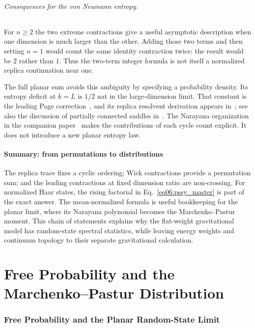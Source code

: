 \documentclass[11pt,letterpaper]{article}
\theoremstyle{plain}
\theoremstyle{definition}
\theoremstyle{remark}
\begin{document}
\paragraph{Consequences for the von Neumann entropy.}
For $n\geq2$ the two extreme contractions give a useful asymptotic description
when one dimension is much larger than the other.  Adding those two terms and
then setting $n=1$ would count the same identity contraction twice: the result
would be $2$ rather than $1$.  Thus the two-term integer formula is not itself
a normalized replica continuation near one.

The full planar sum avoids this ambiguity by specifying a probability density.
Its entropy deficit at $k=L$ is $1/2$ nat in the large-dimension limit.  That
constant is the leading Page correction~\citep{page1993}, and its replica
resolvent derivation appears in~\citet{pssyetal2022}; see also the discussion of
partially connected saddles in~\citet{marolfmaxfield2020}.  The Narayana
organization in the companion paper~\citep{wuebben2026paper1} makes the
contributions of each cycle count explicit.  It does not introduce a new
planar entropy law.

\subsection{Summary: from permutations to distributions}
\label{subsec06:summary}

The replica trace fixes a cyclic ordering; Wick contractions provide a
permutation sum; and the leading contractions at fixed dimension ratio are
non-crossing.  For normalized Haar states, the rising factorial in
Eq.~\eqref{eq06:pssy_master} is part of the exact answer.  The mean-normalized
formula is useful bookkeeping for the planar limit, where its Narayana
polynomial becomes the Marchenko--Pastur moment.  This chain of statements
explains why the flat-weight gravitational model has random-state spectral
statistics, while leaving energy weights and continuum topology to their
separate gravitational calculation.


\part{Free Probability and the Marchenko--Pastur Distribution}

\section{Free Probability and the Planar Random-State Limit}
\label{sec07:free_probability}
\end{document}
